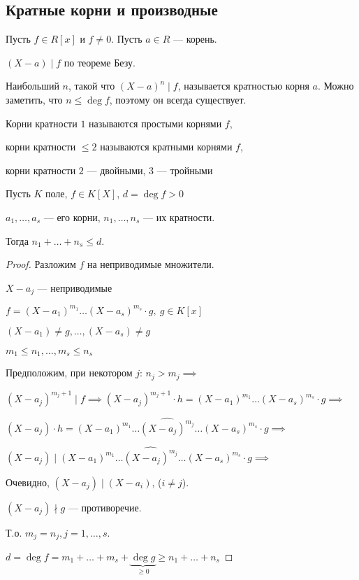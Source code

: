 \subsection{Кратные корни и производные}

\begin{defn}
    Пусть $f \in R[x]$ и $f \neq 0$. Пусть $a \in R$ --- корень.

    $(X - a) \mid f$ по теореме Безу.

    Наибольший $n$, такой что $(X - a)^n \mid f$, называется кратностью корня $a$. Можно заметить, что $n \leq \deg f$, поэтому он всегда существует.

    Корни кратности $1$ называются простыми корнями $f$,

    корни кратности $\leq 2$ называются кратными корнями $f$,

    корни кратности $2$ --- двойными, $3$ --- тройными
\end{defn}

\begin{theorem}
    Пусть $K$ поле, $f \in K[X]$, $d = \deg f > 0$

    $a_1, \ldots, a_s$ --- его корни, $n_1, \ldots, n_s$ --- их кратности.

    Тогда $n_1 + \ldots + n_s \leq d$.
\end{theorem}

\begin{proof}
    Разложим $f$ на неприводимые множители.

    $X - a_j$ --- неприводимые

    $f = (X - a_1)^{m_1} \ldots (X - a_s)^{m_s} \cdot g,~g \in K[x]$

    $(X - a_1) \neq g, \ldots, (X - a_s) \neq g$

    $m_1 \leq n_1, \ldots, m_s \leq n_s$

    Предположим, при некотором $j$: $n_j > m_j \implies$

    $(X - a_j)^{m_j + 1} \mid f \implies (X - a_j)^{m_j + 1} \cdot h = (X - a_1)^{m_1} \ldots (X - a_s)^{m_s} \cdot g \implies$
 
    $(X - a_j) \cdot h = (X - a_1)^{m_1} \ldots \widehat{(X - a_j)^{m_j}} \ldots (X - a_s)^{m_s} \cdot g \implies$

    $(X - a_j) \mid (X - a_1)^{m_1} \ldots \widehat{(X - a_j)^{m_j}} \ldots (X - a_s)^{m_s} \cdot g \implies$

    Очевидно, $(X - a_j) \mid (X - a_i)$, ($i \neq j$).

    $(X - a_j) \nmid g$ --- противоречие.

    Т.о. $m_j = n_j, j = 1, \ldots, s$.

    $d = \deg f = m_1 + \ldots + m_s + \underbrace{\deg g}_{\geq 0} \geq n_1 + \ldots + n_s$
\end{proof}

